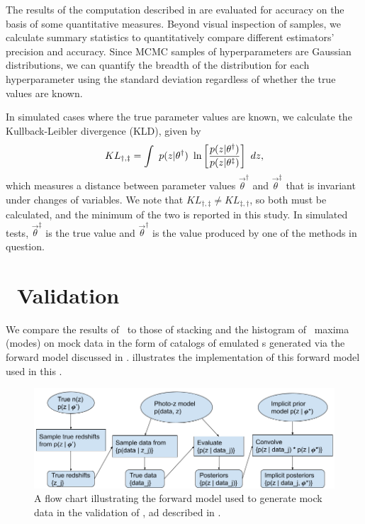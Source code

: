 The results of the computation described in  are evaluated for accuracy on the basis of some quantitative measures.  
Beyond visual inspection of samples, we calculate summary statistics to quantitatively compare different estimators' precision and accuracy.  
Since MCMC samples of hyperparameters are Gaussian distributions, we can quantify the breadth of the distribution for each hyperparameter using the standard deviation regardless of whether the true values are known.  

In simulated cases where the true parameter values are known, we calculate the Kullback-Leibler divergence (KLD), given by 
\begin{equation}
\eqlabel{eq:kl}
KL_{\dagger,\ddagger} = \int\ p(z|\theta^{\dagger})\ \ln\left[\frac{p(z|\theta^{\dagger})}{p(z|\theta^{\ddagger})}\right]\ dz,
\end{equation}
which measures a distance between parameter values $\vec{\theta}^{\dagger}$ and $\vec{\theta}^{\ddagger}$ that is invariant under changes of variables.  
We note that $KL_{\dagger,\ddagger}\neq KL_{\ddagger,\dagger}$, so both must be calculated, and the minimum of the two is reported in this study.  
In simulated tests, $\vec{\theta}^{\ddagger}$ is the true value and $\vec{\theta}^{\dagger}$ is the value produced by one of the methods in question.  

\section{\chippr\ Validation}

We compare the results of \Chippr\ to those of stacking and the histogram of \pzpdf\ maxima (modes) on mock data in the form of catalogs of emulated \pzpdf s generated via the forward model discussed in .
 illustrates the implementation of this forward model used in this \paper.

\begin{figure}
	\begin{center}
		\includegraphics[width=\textwidth]{figures/chippr/flowchart.png}
		\caption{A flow chart illustrating the forward model used to generate mock data in the validation of \Chippr, ad described in .}
	\end{center}
\end{figure}

